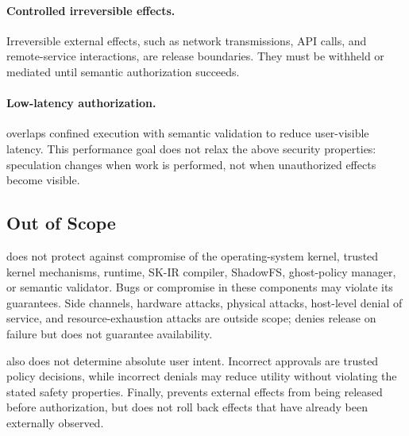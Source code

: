 \paragraph{Controlled irreversible effects.}
Irreversible external effects, such as network transmissions, API calls, and
remote-service interactions, are release boundaries. They must be withheld or
mediated until semantic authorization succeeds.

\paragraph{Low-latency authorization.}
\SystemName overlaps confined execution with semantic validation to reduce
user-visible latency. This performance goal does not relax the above security
properties: speculation changes when work is performed, not when unauthorized
effects become visible.

\subsection{Out of Scope}
\label{sec:threat:out}

\SystemName does not protect against compromise of the operating-system kernel,
trusted kernel mechanisms, runtime, SK-IR compiler, ShadowFS, ghost-policy
manager, or semantic validator. Bugs or compromise in these components may
violate its guarantees. Side channels, hardware attacks, physical attacks,
host-level denial of service, and resource-exhaustion attacks are outside scope;
\SystemName denies release on failure but does not guarantee availability.

\SystemName also does not determine absolute user intent. Incorrect approvals
are trusted policy decisions, while incorrect denials may reduce utility without
violating the stated safety properties. Finally, \SystemName prevents external
effects from being released before authorization, but does not roll back effects
that have already been externally observed.
